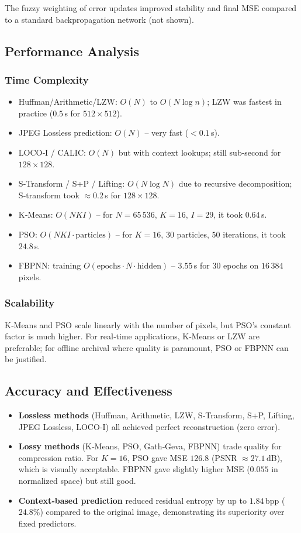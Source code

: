 The fuzzy weighting of error updates improved stability and final MSE compared to a standard backpropagation network (not shown).

\subsection{Performance Analysis}

\subsubsection{Time Complexity}
\begin{itemize}
    \item Huffman/Arithmetic/LZW: $O(N)$ to $O(N \log n)$; LZW was fastest in practice ($0.5$ s for $512\times512$).
    \item JPEG Lossless prediction: $O(N)$ – very fast ($<0.1$ s).
    \item LOCO‑I / CALIC: $O(N)$ but with context lookups; still sub‑second for $128\times128$.
    \item S‑Transform / S+P / Lifting: $O(N \log N)$ due to recursive decomposition; S‑transform took $\approx 0.2$ s for $128\times128$.
    \item K‑Means: $O(N K I)$ – for $N=65\,536$, $K=16$, $I=29$, it took $0.64$ s.
    \item PSO: $O(N K I \cdot \text{particles})$ – for $K=16$, $30$ particles, $50$ iterations, it took $24.8$ s.
    \item FBPNN: training $O(\text{epochs} \cdot N \cdot \text{hidden})$ – $3.55$ s for 30 epochs on $16\,384$ pixels.
\end{itemize}

\subsubsection{Scalability}
K‑Means and PSO scale linearly with the number of pixels, but PSO’s constant factor is much higher. For real‑time applications, K‑Means or LZW are preferable; for offline archival where quality is paramount, PSO or FBPNN can be justified.

\subsection{Accuracy and Effectiveness}

\begin{itemize}
    \item \textbf{Lossless methods} (Huffman, Arithmetic, LZW, S‑Transform, S+P, Lifting, JPEG Lossless, LOCO‑I) all achieved perfect reconstruction (zero error).
    \item \textbf{Lossy methods} (K‑Means, PSO, Gath‑Geva, FBPNN) trade quality for compression ratio. For $K=16$, PSO gave MSE $126.8$ (PSNR $\approx 27.1$ dB), which is visually acceptable. FBPNN gave slightly higher MSE ($0.055$ in normalized space) but still good.
    \item \textbf{Context‑based prediction} reduced residual entropy by up to $1.84$ bpp ($24.8\%$) compared to the original image, demonstrating its superiority over fixed predictors.
\end{itemize}

